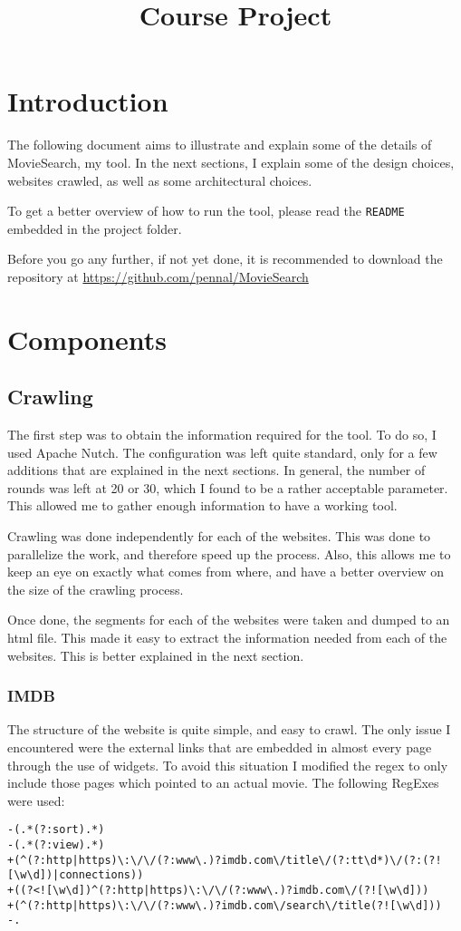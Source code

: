 \documentclass[a4paper]{article}
\title{\huge Course Project}
\date{}
\newcommand{\tool}{MovieSearch}
\begin{document}
\maketitle
\vspace{-10mm}

\section{Introduction}
The following document aims to illustrate and explain some of the details of \tool, my tool. In the next sections, I explain some of the design choices, websites crawled, as well as some architectural choices. 

To get a better overview of how to run the tool, please read the \texttt{README} embedded in the project folder. 

Before you go any further, if not yet done, it is recommended to download the repository at \url{https://github.com/pennal/\tool}
\section{Components}
\subsection{Crawling}
The first step was to obtain the information required for the tool. To do so, I used Apache Nutch. The configuration was left quite standard, only for a few additions that are explained in the next sections. In general, the number of rounds was left at 20 or 30, which I found to be a rather acceptable parameter. This allowed me to gather enough information to have a working tool. 

Crawling was done independently for each of the websites. This was done to parallelize the work, and therefore speed up the process. Also, this allows me to keep an eye on exactly what comes from where, and have a better overview on the size of the crawling process.

Once done, the segments for each of the websites were taken and dumped to an html file. This made it easy to extract the information needed from each of the websites. This is better explained in the next section. 
\subsubsection{IMDB}
The structure of the website is quite simple, and easy to crawl. The only issue I encountered were the external links that are embedded in almost every page through the use of widgets. To avoid this situation I modified the regex to only include those pages which pointed to an actual movie. The following RegExes were used:
\begin{verbatim}
-(.*(?:sort).*)
-(.*(?:view).*)
+(^(?:http|https)\:\/\/(?:www\.)?imdb.com\/title\/(?:tt\d*)\/(?:(?![\w\d])|connections))
+((?<![\w\d])^(?:http|https)\:\/\/(?:www\.)?imdb.com\/(?![\w\d]))
+(^(?:http|https)\:\/\/(?:www\.)?imdb.com\/search\/title(?![\w\d]))
-.	
\end{verbatim}
\end{document}
